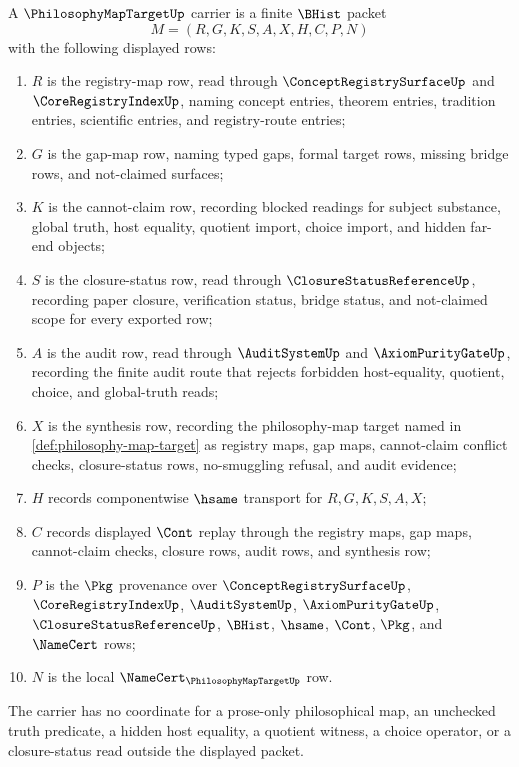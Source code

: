 \begin{definition}
\label{def:philosophy-map-target-carrier}
A $\PhilosophyMapTargetUp$ carrier is a finite $\BHist$ packet
$$
M=(R,G,K,S,A,X,H,C,P,N)
$$
with the following displayed rows:
\begin{enumerate}
\item $R$ is the registry-map row, read through $\ConceptRegistrySurfaceUp$ and $\CoreRegistryIndexUp$, naming concept entries, theorem entries, tradition entries, scientific entries, and registry-route entries;
\item $G$ is the gap-map row, naming typed gaps, formal target rows, missing bridge rows, and not-claimed surfaces;
\item $K$ is the cannot-claim row, recording blocked readings for subject substance, global truth, host equality, quotient import, choice import, and hidden far-end objects;
\item $S$ is the closure-status row, read through $\ClosureStatusReferenceUp$, recording paper closure, verification status, bridge status, and not-claimed scope for every exported row;
\item $A$ is the audit row, read through $\AuditSystemUp$ and $\AxiomPurityGateUp$, recording the finite audit route that rejects forbidden host-equality, quotient, choice, and global-truth reads;
\item $X$ is the synthesis row, recording the philosophy-map target named in \autoref{def:philosophy-map-target} as registry maps, gap maps, cannot-claim conflict checks, closure-status rows, no-smuggling refusal, and audit evidence;
\item $H$ records componentwise $\hsame$ transport for $R,G,K,S,A,X$;
\item $C$ records displayed $\Cont$ replay through the registry maps, gap maps, cannot-claim checks, closure rows, audit rows, and synthesis row;
\item $P$ is the $\Pkg$ provenance over $\ConceptRegistrySurfaceUp$, $\CoreRegistryIndexUp$, $\AuditSystemUp$, $\AxiomPurityGateUp$, $\ClosureStatusReferenceUp$, $\BHist$, $\hsame$, $\Cont$, $\Pkg$, and $\NameCert$ rows;
\item $N$ is the local $\NameCert_{\PhilosophyMapTargetUp}$ row.
\end{enumerate}
The carrier has no coordinate for a prose-only philosophical map, an unchecked truth predicate, a hidden host equality, a quotient witness, a choice operator, or a closure-status read outside the displayed packet.
\end{definition}

